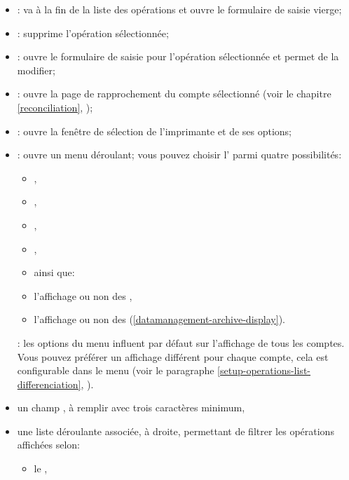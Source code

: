 \begin{itemize}
	\item {}: va à la fin de la liste des opérations et ouvre le formulaire de saisie vierge;
	\item {}: supprime l'opération sélectionnée;
	\item {}: ouvre le formulaire de saisie pour l'opération sélectionnée et permet de la modifier;
	\item {}: ouvre la page de rapprochement du compte sélectionné (voir le chapitre \vref{reconciliation}, );
	\item {}: ouvre la fenêtre de sélection de l'imprimante et de ses options;
	\item {}: ouvre un menu déroulant; vous pouvez choisir l' parmi quatre possibilités:
		\begin{itemize} 
	 		\item {},
	 		\item {},
	 		\item {},
	 		\item {},
		 	\item[] \hspace{-15pt} ainsi que:
	 		\item l'affichage ou non des ,
	 		\item l'affichage ou non des  (\vref{datamanagement-archive-display}).
		\end{itemize}
	\Note{}: les options du menu  influent par défaut sur l'affichage de tous les comptes. Vous pouvez préférer un affichage différent pour chaque compte, cela est configurable dans le menu  (voir le paragraphe \vref{setup-operations-list-differenciation}, ).	
	\item un champ , à remplir avec trois caractères minimum, 
	\item une liste déroulante associée, à droite, permettant de filtrer les opérations affichées selon:
		\begin{itemize} 
			\item le ,

\end{itemize}
\end{itemize}
